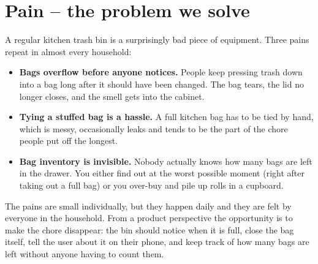 \documentclass{article}
\begin{document}
\fi

\section{Pain -- the problem we solve}
\label{sec:pain}

A regular kitchen trash bin is a surprisingly bad piece of equipment. Three pains repeat in almost every household:

\begin{itemize}
    \item \textbf{Bags overflow before anyone notices.} People keep pressing trash down into a bag long after it should have been changed. The bag tears, the lid no longer closes, and the smell gets into the cabinet.
    \item \textbf{Tying a stuffed bag is a hassle.} A full kitchen bag has to be tied by hand, which is messy, occasionally leaks and tends to be the part of the chore people put off the longest.
    \item \textbf{Bag inventory is invisible.} Nobody actually knows how many bags are left in the drawer. You either find out at the worst possible moment (right after taking out a full bag) or you over-buy and pile up rolls in a cupboard.
\end{itemize}

The pains are small individually, but they happen daily and they are felt by everyone in the household. From a product perspective the opportunity is to make the chore disappear: the bin should notice when it is full, close the bag itself, tell the user about it on their phone, and keep track of how many bags are left without anyone having to count them.

\ifdefined\mainfile\else
\end{document}
